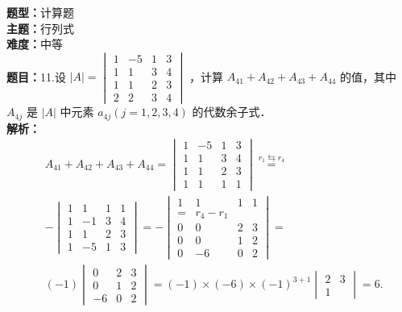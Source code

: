 \documentclass{ctexart}
\newenvironment{question}[5]{%
	\noindent\textbf{题型：}#1\\
	\textbf{主题：}#2\\
	\textbf{难度：}#3\\
	\textbf{题目：}#4\\
	\textbf{解析：}#5\\
	\vspace{1em}
}{}
\begin{document}
	\begin{question}
		{计算题}
		{行列式}
		{中等}
		{11.设 $|A|=\begin{vmatrix}1 & -5 & 1 & 3 \\ 1 & 1 & 3 & 4 \\ 1 & 1 & 2 & 3 \\ 2 & 2 & 3 & 4\end{vmatrix}$ ，计算 $A_{41}+A_{42}+A_{43}+A_{44}$ 的值，其中 $A_{4 j}$ 是 $|A|$ 中元素 $a_{4 j}(j=1,2,3,4)$ 的代数余子式．}
		{$$
			\begin{aligned}
				& A_{41}+A_{42}+A_{43}+A_{44}=\begin{vmatrix}
					1 & -5 & 1 & 3 \\
					1 & 1 & 3 & 4 \\
					1 & 1 & 2 & 3 \\
					1 & 1 & 1 & 1
				\end{vmatrix} \stackrel{r_1 \leftrightarrows r_4}{=} \\
				& -\begin{vmatrix}
					1 & 1 & 1 & 1 \\
					1 & -1 & 3 & 4 \\
					1 & 1 & 2 & 3 \\
					1 & -5 & 1 & 3
				\end{vmatrix} =-\begin{vmatrix}
					1 & 1 & 1 & 1 \\
					= & r_4-r_1 \\
					0 & 0 & 2 & 3 \\
					0 & 0 & 1 & 2 \\
					0 & -6 & 0 & 2
				\end{vmatrix}= \\
				& (-1)\begin{vmatrix}
					0 & 2 & 3 \\
					0 & 1 & 2 \\
					-6 & 0 & 2
				\end{vmatrix}=(-1) \times(-6) \times(-1)^{3+1}\begin{vmatrix}
					2 & 3 \\
					1
				\end{vmatrix}=6 .
			\end{aligned}
			$$}
	\end{question}
	
\end{document}
